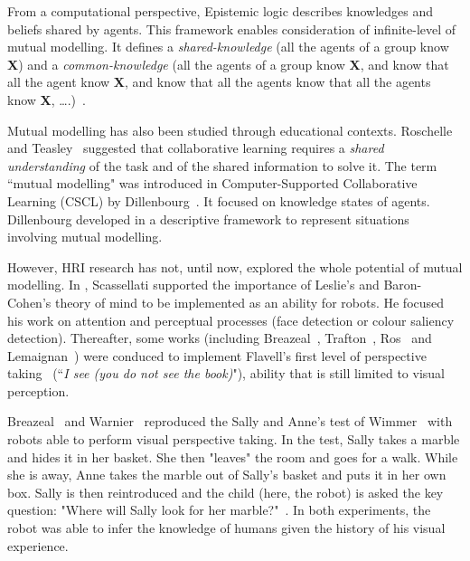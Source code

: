 \documentclass[10pt,a4paper]{article}
\begin{document}
From a computational perspective, Epistemic logic describes knowledges and beliefs shared by agents. This framework enables consideration of infinite-level of mutual modelling. It defines a \textit{shared-knowledge} (all the agents of a group know \textbf{X}) and a \textit{common-knowledge} (all the agents of a group know \textbf{X}, and know that all the agent know \textbf{X}, and know that all the agents know that all the agents know \textbf{X}, \dots.)~\cite{hendricks2008epistemic}. 

Mutual modelling has also been studied through educational contexts. Roschelle and Teasley~\cite{roschelle1995construction} suggested that collaborative learning requires a \textit{shared understanding} of the task and of the shared information to solve it. 
The term ``mutual modelling" was introduced in Computer-Supported Collaborative Learning (CSCL) by Dillenbourg~\cite{dillenbourg1999you}. It focused on knowledge states of agents. Dillenbourg developed in \cite{sangin2007partner} a descriptive framework to represent situations involving mutual modelling.

However, HRI research has not, until now, explored the whole potential of mutual modelling. In \cite{scassellati2002theory}, Scassellati supported the importance of Leslie's and Baron-Cohen's theory of mind to be implemented as an ability for robots. 
He focused his work on attention and perceptual processes (face detection or colour saliency detection). Thereafter, some works (including Breazeal~\cite{breazeal2006using}, Trafton~\cite{Trafton2005}, Ros~\cite{Ros2010} and Lemaignan~\cite{lemaignan2012thesis}) were conduced to implement Flavell's first level of perspective taking~\cite{flavell1977development} (``\textit{I see (you do not see the book)}"), ability that is still limited to visual perception. 

Breazeal~\cite{breazeal2009embodied} and Warnier~\cite{warnier2012when} reproduced the Sally and Anne's test of Wimmer~\cite{wimmer1983beliefs} with robots able to perform visual perspective taking.
In the test, Sally takes a marble and hides it in her basket. She then "leaves" the room and goes for a walk. While she is away, Anne takes the marble out of Sally's basket and puts it in her own box. Sally is then reintroduced and the child (here, the robot) is asked the key question: "Where will Sally look for her marble?"~\cite{baron1985does}.
In both experiments, the robot was able to infer the knowledge of humans given the history of his visual experience.
\end{document}
